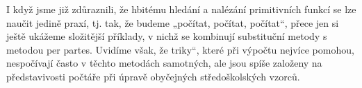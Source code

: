     I když jsme již zdůraznili, že hbitému hledání a nalézání primitivních funkcí se lze naučit 
    jedině praxí, tj. tak, že budeme „počítat, počítat, počítat“, přece jen si ještě ukážeme
    složitější příklady, v nichž se kombinují substituční metody s metodou per partes. Uvidíme však,
    že triky“, které při výpočtu nejvíce pomohou, nespočívají často v těchto metodách samotných, ale
    jsou spíše založeny na představivosti počtáře při úpravě obyčejných středoškolských vzorců.

    
    
    
    
    
